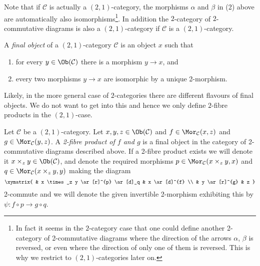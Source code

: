 Note that if $\mathcal{C}$ is actually a $(2, 1)$-category,
the morphisms $\alpha$ and $\beta$ in (2) above are automatically
also isomorphisms\footnote{In fact it seems in the $2$-category case
that one could define another 2-category of 2-commutative diagrams where
the direction of the arrows $\alpha$, $\beta$ is reversed, or even
where the direction of only one of them is reversed. This is why
we restrict to $(2, 1)$-categories later on.}.
In addition the $2$-category of
$2$-commutative diagrams is also a $(2, 1)$-category if $\mathcal{C}$ is
a $(2, 1)$-category.

\begin{definition}
\label{definition-final-object-2-category}
A {\it final object} of a $(2, 1)$-category
$\mathcal{C}$ is an object $x$ such that
\begin{enumerate}
\item for every $y \in \Ob(\mathcal{C})$ there is a morphism $y \to x$,
and
\item every two morphisms $y \to x$ are isomorphic by a unique 2-morphism.
\end{enumerate}
\end{definition}

\noindent
Likely, in the more general case of $2$-categories there are different
flavours of final objects. We do not want to get into this and hence
we only define $2$-fibre products in the $(2, 1)$-case.

\begin{definition}
\label{definition-2-fibre-products}
Let $\mathcal{C}$ be a $(2, 1)$-category.
Let $x, y, z\in \Ob(\mathcal{C})$ and
$f\in \Mor_\mathcal{C}(x, z)$
and $g\in \Mor_{\mathcal C}(y, z)$. A
{\it 2-fibre product of $f$ and $g$} is
a final object in the category of 2-commutative diagrams
described above. If a 2-fibre product exists we
will denote it $x \times_z y\in \Ob(\mathcal{C})$, and denote the
required morphisms $p\in \Mor_{\mathcal C}(x \times_z y, x)$ and
$q\in \Mor_{\mathcal C}(x \times_z y, y)$ making the diagram
$$
\xymatrix{
& x \times_z y \ar[r]^{p} \ar[d]_q & x \ar[d]^{f} \\
& y \ar[r]^{g} & z }
$$
2-commute and we will denote the given invertible
2-morphism exhibiting this by $\psi : f \circ p \to g \circ q$.
\end{definition}

